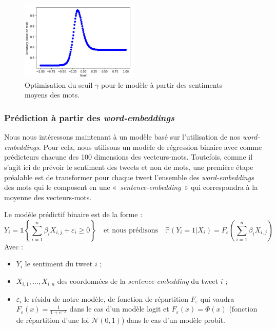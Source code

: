 \documentclass[11pt,french,french]{article}
\begin{document}
\begin{figure}[h]
\begin{center}
\includegraphics[width=0.5\textwidth]{img/max_baseline.png}
\captionsetup{margin=0cm,format=hang,justification=justified}
\caption{Optimisation du seuil $\gamma$ pour le modèle à partir des sentiments moyens des mots.}\label{fig:max_baseline}
\end{center}
\end{figure}

\subsubsection{\texorpdfstring{Prédiction à partir des
\emph{word-embeddings}}{Prédiction à partir des word-embeddings}}\label{sec:wordembeddings}

Nous nous intéressons maintenant à un modèle basé sur l'utilisation de
nos \emph{word-embeddings}. Pour cela, nous utilisons un modèle de
régression binaire avec comme prédicteurs chacune des 100 dimensions des
vecteurs-mots. Toutefois, comme il s'agit ici de prévoir le sentiment
des tweets et non de mots, une première étape préalable est de
transformer pour chaque tweet l'ensemble des \emph{word-embeddings} des
mots qui le composent en une «~\emph{sentence-embedding}~» qui
correspondra à la moyenne des vecteurs-mots.

Le modèle prédictif binaire est de la forme : \[
Y_i = \mathds{1}\left\{ \sum_{i = 1}^n \beta_i X_{i,j} + \varepsilon_i \geq 0 \right\} 
\quad 
\text{et nous prédisons} 
\quad  
\mathbb{P}(Y_i = 1 | X_{i}) = F_{\varepsilon}\left(\sum_{i = 1}^n \beta_i X_{i,j}\right)
\] Avec :

\begin{itemize}
\item $Y_i$ le sentiment du tweet $i$ ;
\item $X_{i,1}, \dots, X_{i,n}$ des coordonnées de la \emph{sentence-embedding} du tweet $i$ ;
\item $\varepsilon_i$ le résidu de notre modèle, de fonction de répartition $F_{\varepsilon}$ qui vaudra $F_{\varepsilon}(x) = \frac{1}{1 + e^{-x}}$ dans le cas d'un modèle logit et $F_{\varepsilon}(x) = \Phi(x)$ (fonction de répartition d'une loi $\mathcal{N}(0, 1)$) dans le cas d'un modèle probit. 
\end{itemize}
\end{document}
